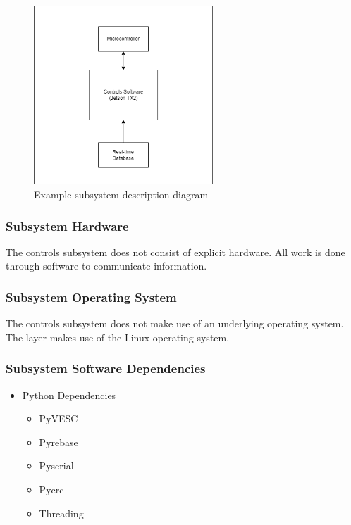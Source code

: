 \begin{figure}[h!]
	\centering
 	\includegraphics[width=0.60\textwidth]{images/Controls Software Subsystem.drawio.png}
 \caption{Example subsystem description diagram}
\end{figure}

\subsubsection{Subsystem Hardware}
The controls subsystem does not consist of explicit hardware. All work is done through software to communicate information.

\subsubsection{Subsystem Operating System}
The controls subsystem does not make use of an underlying operating system. The layer makes use of the Linux operating system.

\subsubsection{Subsystem Software Dependencies}
\begin{itemize}
    \item Python Dependencies
    \begin{itemize}
        \item PyVESC
        \item Pyrebase
        \item Pyserial
        \item Pycrc
        \item Threading
    \end{itemize}
\end{itemize}

